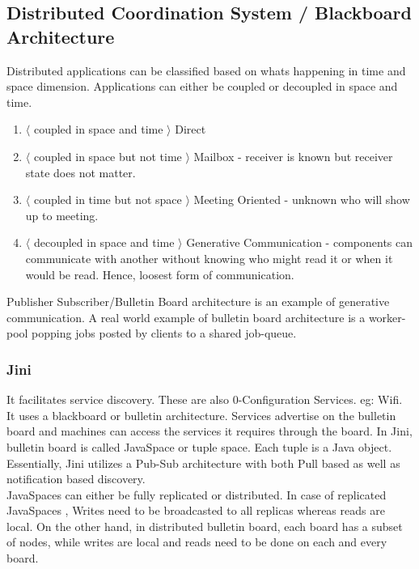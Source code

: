 \documentclass[a4paper]{article}
\begin{document}
\subsection{Distributed Coordination System / Blackboard Architecture}

Distributed applications can be classified based on whats happening in time and space dimension. Applications can either be coupled or decoupled in space and time.

\begin{enumerate}

\item $\langle$ coupled in space and time $\rangle$ Direct  
\item $\langle$ coupled in space but not time $\rangle$ Mailbox - receiver is known but receiver state does not matter.
\item $\langle$ coupled in time but not space $\rangle$ Meeting Oriented - unknown who will show up to meeting.
\item $\langle$ decoupled in space and time $\rangle$ Generative Communication -  components can communicate with another without knowing who might read it or when it would be read. Hence, loosest form of communication.
\end{enumerate}

Publisher Subscriber/Bulletin Board architecture is an example of generative communication. A real world example of bulletin board architecture is a worker-pool popping jobs posted by clients to a shared job-queue.

\subsubsection{Jini}

It facilitates service discovery. These are also 0-Configuration Services. eg: Wifi. It uses a blackboard or bulletin architecture. Services advertise on the bulletin board and machines can access the services it requires through the board.
In Jini, bulletin board is called JavaSpace or tuple space. Each tuple is a Java object. Essentially, Jini utilizes a Pub-Sub architecture with both Pull based as well as notification based discovery.\\

JavaSpaces can either be fully replicated or distributed. In case of replicated JavaSpaces , Writes need to be broadcasted to all replicas whereas reads are local. On the other hand, in distributed bulletin board, each  board has a subset of nodes, while writes are local and reads need to be done on each and every board.
\end{document}
